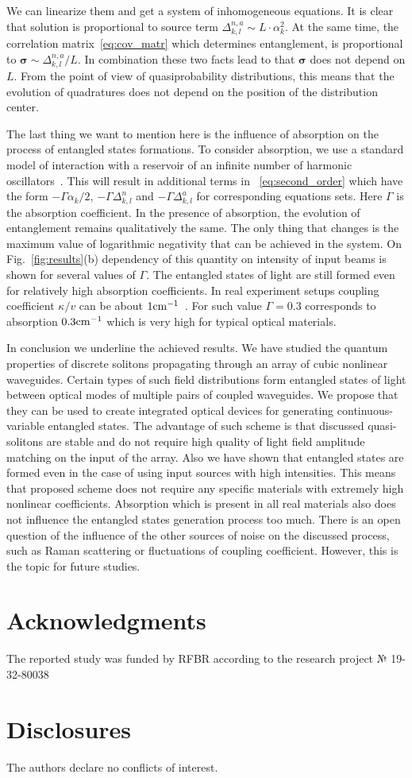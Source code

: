 \documentclass{osa-article}
\begin{document}
We can linearize them and get a system of inhomogeneous equations.
It is clear that solution is proportional to source term $\Delta^{n,a}_{k,l}\sim L \cdot \alpha^2_k$. 
At the same time, the correlation matrix~\eqref{eq:cov_matr} which determines entanglement, is proportional to $\bm{\sigma}\sim \Delta^{n,a}_{k,l}/L$.
In combination these two facts lead to that $\bm{\sigma}$ does not depend on $L$. 
From the point of view of quasiprobability distributions, this means that the evolution of quadratures does not depend on the position of the distribution center.
\par
The last thing we want to mention here is the influence of absorption on the process of entangled states formations.
To consider absorption, we use a standard model of interaction with   a reservoir of an infinite number of harmonic oscillators~\cite{drummond_quantum_2014}.
This will result in additional terms in ~\eqref{eq:second_order} which have the form $-\Gamma \alpha_k / 2$, $-\Gamma \Delta^{n}_{k,l}$ and $-\Gamma \Delta^{a}_{k,l}$ for corresponding equations sets. 
Here $\Gamma$ is the absorption coefficient.
In the presence of absorption, the evolution of entanglement remains qualitatively the same.
The only thing that changes is the maximum value of logarithmic negativity that can be achieved in the system.
On Fig.~\ref{fig:results}(b) dependency of this quantity on intensity of input beams is shown for several values of $\Gamma$.
The entangled states of light are still formed even for relatively high absorption coefficients. 
In real experiment setups coupling coefficient $\kappa/v$ can be about  $1 \rm{cm}^{-1}$~\cite{solntsev_generation_2014}.
For such value $\Gamma=0.3$ corresponds to absorption $0.3 \rm{cm}^{-1}$ which is very high for typical optical materials.
\par
In conclusion we underline the achieved results.
We have studied the quantum properties of discrete solitons propagating through an array of cubic nonlinear waveguides.
Certain types of such field distributions form entangled states of light between optical modes of multiple pairs of coupled waveguides.
We propose that they can be used to create integrated optical devices for generating continuous-variable entangled states.
The advantage of such scheme is that discussed quasi-solitons are stable and do not require high quality of light field amplitude matching on the input of the array.
Also we have shown that entangled states are formed even in the case of using input sources with high intensities.
This means that proposed scheme does not require any specific materials with extremely high nonlinear coefficients.
Absorption which is present in all real materials also does not influence the entangled states generation process too much. 
There is an open question of the influence of the other sources of noise on the discussed process, such as Raman scattering or fluctuations of coupling coefficient.
However, this is the topic for future studies.
\section*{Acknowledgments}
The reported study was funded by RFBR according to the research project № 19-32-80038
\section*{Disclosures}
The authors declare no conflicts of interest.


\end{document}
